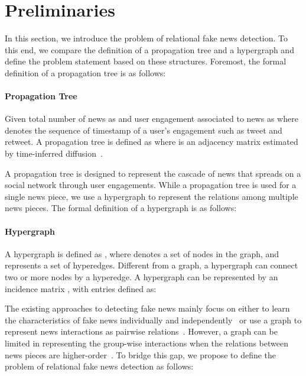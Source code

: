\documentclass[conference]{IEEEtran}
\begin{document}
\section{Preliminaries}
In this section, we introduce the problem of relational fake news detection. To this end, we compare the definition of a propagation tree and a hypergraph and define the problem statement based on these structures. Foremost, the formal definition of a propagation tree is as follows:

\hfill

\paragraph{\textbf{Propagation Tree}}
Given total  number of news as  and user engagement associated to news  as  where  denotes the sequence of timestamp of a user's engagement such as tweet and retweet. A propagation tree is defined as  where  is an adjacency matrix estimated by time-inferred diffusion~\cite{vosoughi2018spread}.


\hfill

A propagation tree is designed to represent the cascade of news that spreads on a social network through user engagements. While a propagation tree is used for a single news piece, we use a hypergraph to represent the relations among multiple news pieces. The formal definition of a hypergraph is as follows:

\hfill

\paragraph{\textbf{Hypergraph}}
A hypergraph is defined as , where  denotes a set of nodes in the graph, and  represents a set of hyperedges. Different from a graph, a hypergraph can connect two or more nodes by a hyperedge. A hypergraph  can be represented by an incidence matrix , with entries defined as:



\hfill





The existing approaches to detecting fake news mainly focus on either to learn the characteristics of fake news individually and independently~\cite{riedel2017simple, shu2019defend} or use a graph to represent news interactions as pairwise relations~\cite{monti2019fake, ren2021fake}. However, a graph can be limited in representing the group-wise interactions when the relations between news pieces are higher-order~\cite{zhou2006learning}. To bridge this gap, we propose to define the problem of relational fake news detection as follows:
\end{document}
